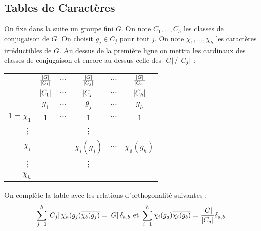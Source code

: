\documentclass{cours}
\begin{document}
\subsection{Tables de Caractères}
\begin{definition}
    On fixe dans la suite un groupe fini $G$. On note $C_{1}, \ldots, C_{h}$ les classes de conjugaison de $G$. On choisit $g_{j} \in C_{j}$ pour tout $j$. On note $\chi_{1}, \ldots, \chi_{h}$ les caractères irréductibles de $G$. Au dessus de la première ligne on mettra les cardinaux des classes de conjugaison et encore au dessus celle des $\left|G\right|/\left|C_{j}\right|$ :
    \begin{center}
        \begin{tabular}{r|ccccc}
                           & $\frac{\left|G\right|}{\left|C_{1}\right|}$ & $\cdots$ & $\frac{\left|G\right|}{\left|C_{j}\right|}$ & $\cdots$ & $\frac{\left|G\right|}{\left|C_{h}\right|}$ \\
                           & $\left|C_{1}\right|$                 & $\cdots$ & $\left|C_{j}\right|$                 & $\cdots$ & $\left|C_{h}\right|$                 \\
                           & $g_{1}$                       & $\cdots$ & $g_{j}$                       & $\cdots$ & $g_{h}$                       \\
            \midrule
            $1 = \chi_{1}$ & $1$                           & $\cdots$ & $1$                           & $\cdots$ & $1$                           \\
            \vdots         &                               &          & \vdots                        &          &                               \\
            $\chi_{i}$     &                               &          & $\chi_{i}(g_{j})$             & $\cdots$ & $\chi_{i}(g_{h})$             \\
            \vdots         &                               &          & \vdots                        &          &                               \\
            $\chi_{h}$     &                               &          &                               &          &
        \end{tabular}
    \end{center}
    On complète la table avec les relations d'orthogonalité suivantes :
    \[
        \sum_{j = 1}^{h}\left|C_{j}\right|\chi_{a}(g_{j})\overline{\chi_{b}(g_{j})} = \left|G\right|\delta_{a, b} \text{ et } \sum_{i = 1}^{h}\chi_{i}(g_{a})\overline{\chi_{i}(g_{b})} = \frac{\left|G\right|}{\left|C_{a}\right|}\delta_{a, b}
    \]
\end{definition}
\end{document}
